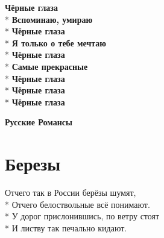 \begin{minipage}{\linewidth}
\hspace*{1.5em}\textbf{Чёрные глаза}\\*
\hspace*{1.5em}\textbf{Вспоминаю, умираю}\\*
\hspace*{1.5em}\textbf{Чёрные глаза}\\*
\hspace*{1.5em}\textbf{Я только о тебе мечтаю}\\*
\hspace*{1.5em}\textbf{Чёрные глаза}\\*
\hspace*{1.5em}\textbf{Самые прекрасные}\\*
\hspace*{1.5em}\textbf{Чёрные глаза}\\*
\hspace*{1.5em}\textbf{Чёрные глаза}\\*
\hspace*{1.5em}\textbf{Чёрные глаза}\\
\end{minipage}

\vspace{\fill}\newpage

\cleardoublepage
\thispagestyle{empty}
\vspace*{\fill}
{\centering\huge\bfseries Русские Романсы\par}
\vspace*{\fill}
\newpage
\section{Березы}
\label{song:Березы}

\medskip

\begin{minipage}{\linewidth}
Отчего так в России берёзы шумят,\\*
Отчего белоствольные всё понимают.\\*
У дорог прислонившись, по ветру стоят\\*
И листву так печально кидают.\\
\end{minipage}\par\medskip\nobreak

